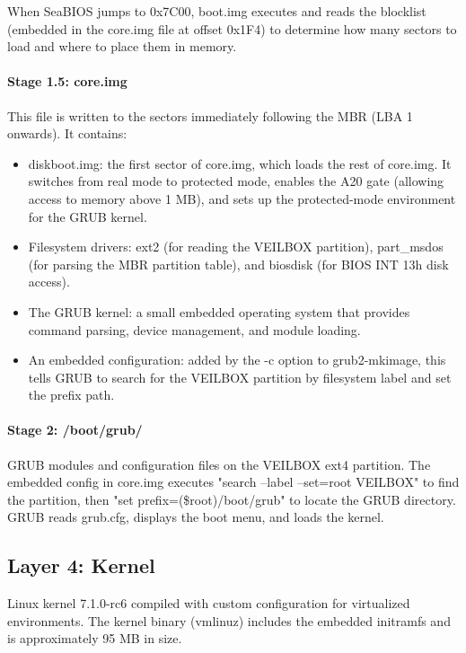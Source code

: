 When SeaBIOS jumps to 0x7C00, boot.img executes and reads the blocklist
(embedded in the core.img file at offset 0x1F4) to determine how many
sectors to load and where to place them in memory.

\paragraph{Stage 1.5: core.img}
This file is written to the sectors immediately following the MBR (LBA 1
onwards). It contains:

\begin{itemize}[nosep]
  \item diskboot.img: the first sector of core.img, which loads the rest of
        core.img. It switches from real mode to protected mode, enables the
        A20 gate (allowing access to memory above 1 MB), and sets up the
        protected-mode environment for the GRUB kernel.
  \item Filesystem drivers: ext2 (for reading the VEILBOX partition),
        part\_msdos (for parsing the MBR partition table), and biosdisk
        (for BIOS INT 13h disk access).
  \item The GRUB kernel: a small embedded operating system that provides
        command parsing, device management, and module loading.
  \item An embedded configuration: added by the -c option to
        grub2-mkimage, this tells GRUB to search for the VEILBOX partition
        by filesystem label and set the prefix path.
\end{itemize}

\paragraph{Stage 2: /boot/grub/}
GRUB modules and configuration files on the VEILBOX ext4 partition. The
embedded config in core.img executes "search --label --set=root VEILBOX"
to find the partition, then "set prefix=(\$root)/boot/grub" to locate the
GRUB directory. GRUB reads grub.cfg, displays the boot menu, and loads
the kernel.

\subsection{Layer 4: Kernel}

Linux kernel 7.1.0-rc6 compiled with custom configuration for virtualized
environments. The kernel binary (vmlinuz) includes the embedded initramfs
and is approximately 95 MB in size.

